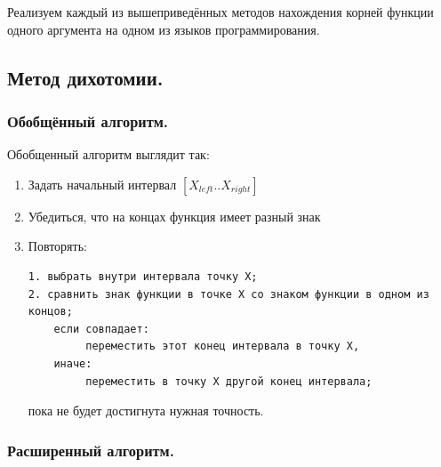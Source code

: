 \documentclass{article}
\begin{document}
	Реализуем каждый из вышеприведённых методов нахождения корней функции одного аргумента на одном из языков программирования.
	
		\subsection{Метод дихотомии.}
			
			\subsubsection{Обобщённый алгоритм.}
			
			Обобщенный алгоритм выглядит так:
				
				\begin{enumerate}
					\item 
					Задать начальный интервал $[X_{left}..X_{right}]$
					\item 
					Убедиться, что на концах функция имеет разный знак
					\item 
					Повторять:
					\begin{verbatim}
1. выбрать внутри интервала точку X;
2. сравнить знак функции в точке X со знаком функции в одном из концов;
    если совпадает:
         переместить этот конец интервала в точку X,
    иначе: 
         переместить в точку X другой конец интервала;
					\end{verbatim}
					пока не будет достигнута нужная точность.
				\end{enumerate}
				
			\subsubsection{Расширенный алгоритм.}
			
\end{document}
